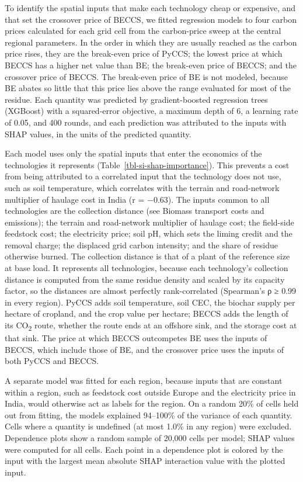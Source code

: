 \documentclass[
  letterpaper,
  twoside,
  twocolumn,
  9pt]{article}
\begin{document}
To identify the spatial inputs that make each technology cheap or
expensive, and that set the crossover price of BECCS, we fitted
regression models to four carbon prices calculated for each grid cell
from the carbon-price sweep at the central regional parameters. In the
order in which they are usually reached as the carbon price rises, they
are the break-even price of PyCCS; the lowest price at which BECCS has a
higher net value than BE; the break-even price of BECCS; and the
crossover price of BECCS. The break-even price of BE is not modeled,
because BE abates so little that this price lies above the range
evaluated for most of the residue. Each quantity was predicted by
gradient-boosted regression trees (XGBoost) \citep{chen2016xgboost} with
a squared-error objective, a maximum depth of 6, a learning rate of
0.05, and 400 rounds, and each prediction was attributed to the inputs
with SHAP values,\citep{lundberg2017} in the units of the predicted
quantity.

Each model uses only the spatial inputs that enter the economics of the
technologies it represents (Table~\ref{tbl-si-shap-importance}). This
prevents a cost from being attributed to a correlated input that the
technology does not use, such as soil temperature, which correlates with
the terrain and road-network multiplier of haulage cost in India (r =
−0.63). The inputs common to all technologies are the collection
distance (see Biomass transport costs and emissions); the terrain and
road-network multiplier of haulage cost; the field-side feedstock cost;
the electricity price; soil pH, which sets the liming credit and the
removal charge; the displaced grid carbon intensity; and the share of
residue otherwise burned. The collection distance is that of a plant of
the reference size at base load. It represents all technologies, because
each technology's collection distance is computed from the same residue
density and scaled by its capacity factor, so the distances are almost
perfectly rank-correlated (Spearman's ρ ≥ 0.99 in every region). PyCCS
adds soil temperature, soil CEC, the biochar supply per hectare of
cropland, and the crop value per hectare; BECCS adds the length of its
CO\textsubscript{2} route, whether the route ends at an offshore sink,
and the storage cost at that sink. The price at which BECCS outcompetes
BE uses the inputs of BECCS, which include those of BE, and the
crossover price uses the inputs of both PyCCS and BECCS.

A separate model was fitted for each region, because inputs that are
constant within a region, such as feedstock cost outside Europe and the
electricity price in India, would otherwise act as labels for the
region. On a random 20\% of cells held out from fitting, the models
explained 94--100\% of the variance of each quantity. Cells where a
quantity is undefined (at most 1.0\% in any region) were excluded.
Dependence plots show a random sample of 20,000 cells per model; SHAP
values were computed for all cells. Each point in a dependence plot is
colored by the input with the largest mean absolute SHAP interaction
value with the plotted input.\citep{lundberg2020}
\end{document}
